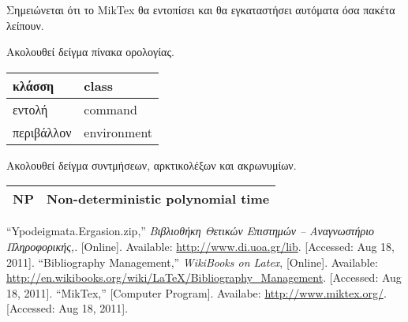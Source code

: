 \documentclass{dithesis}
\begin{document}
    Σημειώνεται ότι το MikTex θα εντοπίσει και θα εγκαταστήσει αυτόματα όσα πακέτα 
    λείπουν.

    \begin{thesisterminology}
    Ακολουθεί δείγμα πίνακα ορολογίας.

    \begin{tabularx}{\textwidth}{|X|X|}
      \hline
      κλάσση     & class \\
      \hline
      εντολή     & command \\
      \hline
      περιβάλλον & environment \\
      \hline
    \end{tabularx}

    \end{thesisterminology}

    \begin{thesisabbreviations}
    Ακολουθεί δείγμα συντμήσεων, αρκτικολέξων και ακρωνυμίων.

    \begin{tabularx}{\textwidth}{|X|X|}
      \hline
      NP & Non-deterministic polynomial time \\
      \hline
    \end{tabularx}

    \end{thesisabbreviations}

    \begin{thesisbibliography}[Αναφορές]{99}
      ``Ypodeigmata.Ergasion.zip,''
      \textit{Βιβλιοθήκη Θετικών Επιστημών -- Αναγνωστήριο Πληροφορικής,}.
      [Online].
      Available: \url{http://www.di.uoa.gr/lib}.
      [Accessed: Aug 18, 2011].
      ``Bibliography Management,''
      \textit{WikiBooks on Latex},
      [Online].
      Available: \url{http://en.wikibooks.org/wiki/LaTeX/Bibliography_Management}.
      [Accessed: Aug 18, 2011].
      ``MikTex,''
      [Computer Program]. Availabe: \url{http://www.miktex.org/}.
      [Accessed: Aug 18, 2011].
\end{thesisbibliography}
\end{document}
